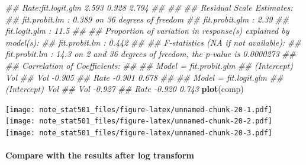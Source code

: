 \documentclass[
]{article}
\newenvironment{Shaded}{\begin{snugshade}}{\end{snugshade}}
\newcommand{\CommentTok}[1]{\textcolor[rgb]{0.56,0.35,0.01}{\textit{#1}}}
\newcommand{\KeywordTok}[1]{\textcolor[rgb]{0.13,0.29,0.53}{\textbf{#1}}}
\newcommand{\NormalTok}[1]{#1}
\begin{document}
\begin{Shaded}
\begin{Highlighting}[]
\CommentTok{## Rate:fit.logit.glm          2.593    0.928      2.794 }
\CommentTok{## }
\CommentTok{## }
\CommentTok{## Residual Scale Estimates:}
\CommentTok{## fit.probit.lm  : 0.389 on 36 degrees of freedom}
\CommentTok{## fit.probit.glm : 2.39 }
\CommentTok{## fit.logit.glm  : 11.5 }
\CommentTok{## }
\CommentTok{## Proportion of variation in response(s) explained by model(s):}
\CommentTok{## fit.probit.lm  : 0.442 }
\CommentTok{## }
\CommentTok{## F-statistics (NA if not available):}
\CommentTok{## fit.probit.lm  : 14.3 on 2 and 36 degrees of freedom, the  p-value is 0.0000273 }
\CommentTok{## }
\CommentTok{## Correlation of Coefficients:}
\CommentTok{## }
\CommentTok{## Model =  fit.probit.glm }
\CommentTok{##      (Intercept) Vol   }
\CommentTok{## Vol  -0.905            }
\CommentTok{## Rate -0.901       0.678}
\CommentTok{## }
\CommentTok{## Model =  fit.logit.glm  }
\CommentTok{##      (Intercept) Vol   }
\CommentTok{## Vol  -0.927            }
\CommentTok{## Rate -0.920       0.743}
\KeywordTok{plot}\NormalTok{(comp)}
\end{Highlighting}
\end{Shaded}

\texttt{[image: note\_stat501\_files/figure-latex/unnamed-chunk-20-1.pdf]}
\texttt{[image: note\_stat501\_files/figure-latex/unnamed-chunk-20-2.pdf]}
\texttt{[image: note\_stat501\_files/figure-latex/unnamed-chunk-20-3.pdf]}

\hypertarget{compare-with-the-results-after-log-transform}{%
\paragraph{Compare with the results after log
transform}\label{compare-with-the-results-after-log-transform}}
\end{document}

